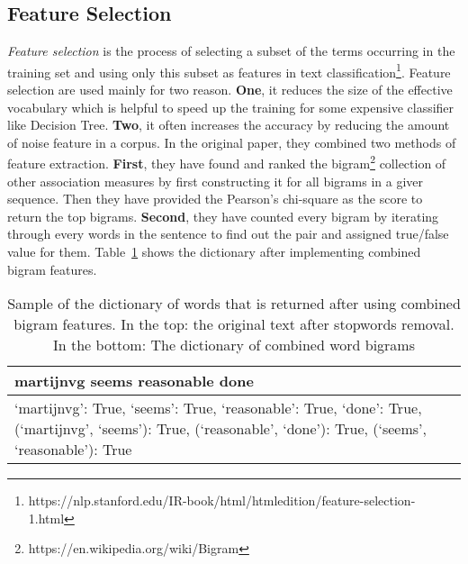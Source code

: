 \subsection{Feature Selection}  
\emph{Feature selection} is the process of selecting a subset of the terms occurring in the training set and using only this subset as features in text classification\footnote{https://nlp.stanford.edu/IR-book/html/htmledition/feature-selection-1.html}. Feature selection are used mainly for two reason. \noindent\textbf{One}, it reduces the size of the effective vocabulary which is helpful to speed up the training for some expensive classifier like Decision Tree. \noindent\textbf{Two}, it often increases the accuracy by reducing the amount of noise feature in a corpus. In the original paper, they combined two methods of feature extraction. \noindent\textbf{First}, they have found and ranked the bigram\footnote{https://en.wikipedia.org/wiki/Bigram} collection of other association measures by first constructing it for all bigrams in a giver sequence. Then they have provided the Pearson's chi-square as the score to return the top bigrams. \noindent\textbf{Second}, they have counted every bigram by iterating through every words in the sentence to find out the pair and assigned true/false value for them. Table~\ref{tbl:feature_selection} shows the dictionary after implementing combined bigram features.
  \begin{table}
	\caption{Sample of the dictionary of words that is returned after using combined bigram features. In the top: the original text after stopwords removal. In the bottom: The dictionary of combined word bigrams}
	\begin{tabular}{ p{3.25in}}
		\toprule
		martijnvg seems reasonable done \\
		\midrule
		{`martijnvg': True, `seems': True, `reasonable': True, `done': True, (`martijnvg', `seems'): True, (`reasonable', `done'): True, (`seems', `reasonable'): True} \\
		\bottomrule
		
	\end{tabular}
	\label{tbl:feature_selection}
\end{table}

